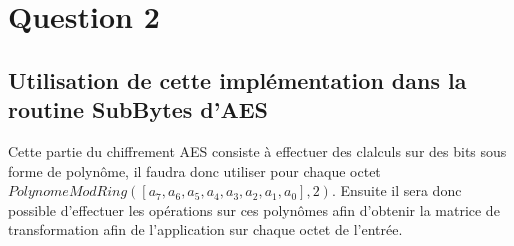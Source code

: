 \documentclass{report}
\begin{document}
\section{\texorpdfstring{\textbf{Question
2}}{Question 2}}\label{question-2}

\subsection{\texorpdfstring{\textbf{Utilisation de cette implémentation
dans la routine SubBytes
d'AES}}{Utilisation de cette implémentation dans la routine SubBytes d'AES}}\label{utilisation-de-cette-impluxe9mentation-dans-la-routine-subbytes-daes}

Cette partie du chiffrement AES consiste à effectuer des clalculs sur
des bits sous forme de polynôme, il faudra donc utiliser pour chaque
octet \(PolynomeModRing([a_7,a_6,a_5,a_4,a_3,a_2,a_1, a_0], 2)\).
Ensuite il sera donc possible d'effectuer les opérations sur ces
polynômes afin d'obtenir la matrice de transformation afin de
l'application sur chaque octet de l'entrée.


    
    
    
    
\end{document}
